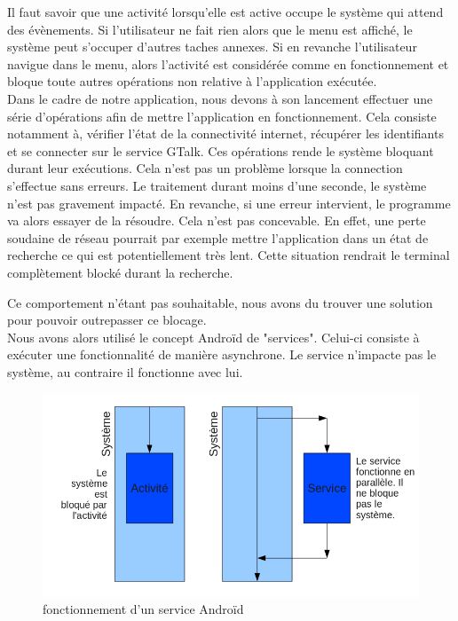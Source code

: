 Il faut savoir que une activité lorsqu'elle est active occupe le système qui attend des évènements.
Si l'utilisateur ne fait rien alors que le menu est affiché, le système peut s'occuper d'autres 
taches annexes. Si en revanche l'utilisateur navigue dans le menu, alors l'activité est considérée
comme en fonctionnement et bloque toute autres opérations non relative à l'application exécutée.
\\


Dans le cadre de notre application, nous devons à son lancement effectuer une série d'opérations 
afin de mettre l'application en fonctionnement. Cela consiste notamment à, vérifier l'état de la 
connectivité internet, récupérer les identifiants et se connecter sur le service GTalk. Ces 
opérations rende le système bloquant durant leur exécutions. Cela n'est pas un problème lorsque la 
connection s'effectue sans erreurs. Le traitement durant moins d'une seconde, le système n'est pas
gravement impacté. En revanche, si une erreur intervient, le programme va alors essayer de la résoudre.
Cela n'est pas concevable. En effet, une perte soudaine de réseau pourrait par exemple mettre 
l'application dans un état de recherche ce qui est potentiellement très lent. Cette situation rendrait
le terminal complètement blocké durant la recherche. 

Ce comportement n'étant pas souhaitable, nous avons du trouver une solution pour pouvoir outrepasser ce blocage.
\\


Nous avons alors utilisé le concept Androïd de "services". Celui-ci consiste à exécuter une fonctionnalité 
de manière asynchrone. Le service n'impacte pas le système, au contraire il fonctionne avec lui. 

\begin{figure}[!h]
	\center
	\includegraphics[width=13cm]{img/fonctionnement-des-services-Android.png}
	\caption{fonctionnement d'un service Androïd}
\end{figure}

